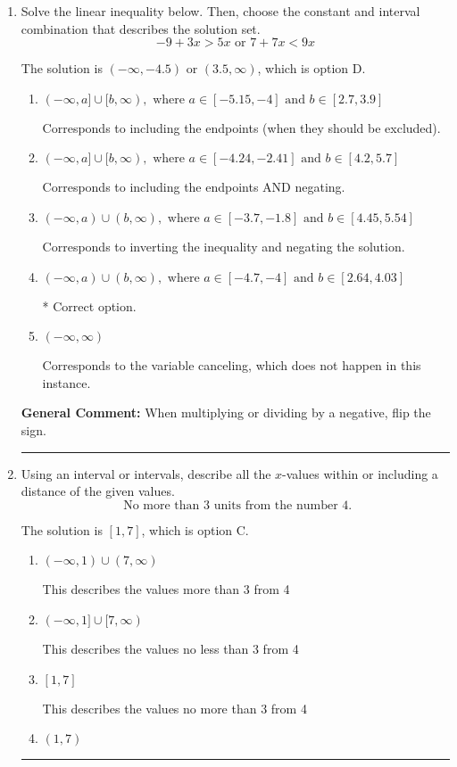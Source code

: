 \documentclass{extbook}[14pt]
\newcommand{\litem}[1]{\item #1

\rule{\textwidth}{0.4pt}}
\begin{document}
\begin{enumerate}\litem{
Solve the linear inequality below. Then, choose the constant and interval combination that describes the solution set.
\[ -9 + 3 x > 5 x \text{ or } 7 + 7 x < 9 x \]

The solution is \( (-\infty, -4.5) \text{ or } (3.5, \infty) \), which is option D.\begin{enumerate}[label=\Alph*.]
\item \( (-\infty, a] \cup [b, \infty), \text{ where } a \in [-5.15, -4] \text{ and } b \in [2.7, 3.9] \)

Corresponds to including the endpoints (when they should be excluded).
\item \( (-\infty, a] \cup [b, \infty), \text{ where } a \in [-4.24, -2.41] \text{ and } b \in [4.2, 5.7] \)

Corresponds to including the endpoints AND negating.
\item \( (-\infty, a) \cup (b, \infty), \text{ where } a \in [-3.7, -1.8] \text{ and } b \in [4.45, 5.54] \)

Corresponds to inverting the inequality and negating the solution.
\item \( (-\infty, a) \cup (b, \infty), \text{ where } a \in [-4.7, -4] \text{ and } b \in [2.64, 4.03] \)

 * Correct option.
\item \( (-\infty, \infty) \)

Corresponds to the variable canceling, which does not happen in this instance.
\end{enumerate}

\textbf{General Comment:} When multiplying or dividing by a negative, flip the sign.
}
\litem{
Using an interval or intervals, describe all the $x$-values within or including a distance of the given values.
\[ \text{ No more than } 3 \text{ units from the number } 4. \]

The solution is \( [1, 7] \), which is option C.\begin{enumerate}[label=\Alph*.]
\item \( (-\infty, 1) \cup (7, \infty) \)

This describes the values more than 3 from 4
\item \( (-\infty, 1] \cup [7, \infty) \)

This describes the values no less than 3 from 4
\item \( [1, 7] \)

This describes the values no more than 3 from 4
\item \( (1, 7) \)


\end{enumerate}}
\end{enumerate}
\end{document}
